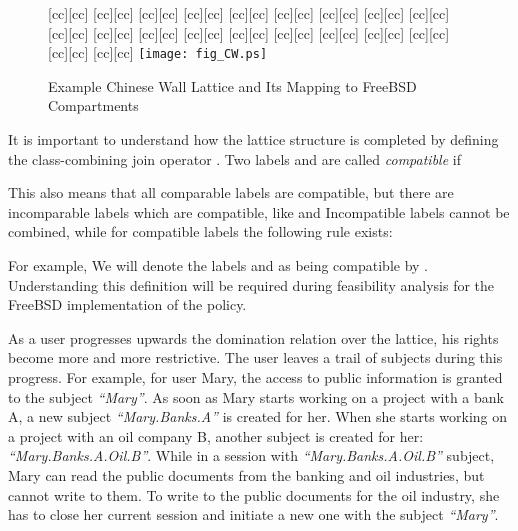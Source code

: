 \documentclass[10pt,a4paper,conference,onecolumn]{IEEEtran}
\newcommand{\KBERcode}[1]{\textsl{#1}}
\begin{document}
\begin{figure}[ht]
\centering
{}[cc][cc]{}
[cc][cc]{}
[cc][cc]{}
[cc][cc]{}
[cc][cc]{}
[cc][cc]{}
[cc][cc]{}
[cc][cc]{}
[cc][cc]{}
[cc][cc]{}
[cc][cc]{}
[cc][cc]{}
[cc][cc]{}
[cc][cc]{}
[cc][cc]{}
[cc][cc]{}
[cc][cc]{}
[cc][cc]{}
[cc][cc]{}
[cc][cc]{}
\texttt{[image: fig\_CW.ps]}
\caption{Example Chinese Wall Lattice and Its Mapping to FreeBSD Compartments}
\label{KBER:fig_CW}
\end{figure}


It is important to understand how the lattice structure is completed 
by defining the class-combining join operator . Two labels 
 and  are called \emph{compatible} if 

This also means that all comparable labels are compatible, but there are
incomparable labels which are compatible, like
 and  Incompatible labels cannot 
be combined, while for compatible labels the following rule exists:

For example, 
We will denote the labels  and  as being compatible by .
Understanding this definition will be required during feasibility analysis
for the FreeBSD implementation of the policy.

As a user progresses upwards the domination relation over the lattice,
his rights become more and more restrictive. The user leaves a trail
of subjects during this progress. For example, for user Mary, the access
to public information is granted to the subject \KBERcode{``Mary''}. 
As soon as Mary starts working on a project with a bank A, a new 
subject \KBERcode{``Mary.Banks.A''} is created for her.
When she starts working on a project with an oil company B, another subject
is created for her: \KBERcode{``Mary.Banks.A.Oil.B''}. While in a session
with \KBERcode{``Mary.Banks.A.Oil.B''} subject, Mary can read the public 
documents from the banking and oil industries, but cannot write to them.
To write to the public documents for the oil industry,
she has to close her current session and initiate a new one with the subject
\KBERcode{``Mary''}.
\end{document}
